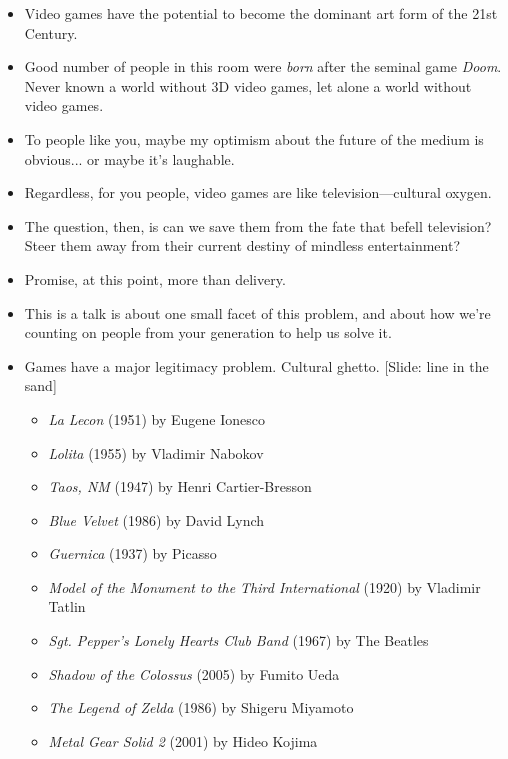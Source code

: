 \documentclass[12pt]{article}
\begin{document}
{\Huge

\begin{itemize}


\item Video games have the potential to become the dominant art form of the 21st Century.

\item Good number of people in this room were {\it born} after the seminal game {\it Doom}.  Never known a world without 3D video games, let alone a world without video games.

\item To people like you, maybe my optimism about the future of the medium is obvious... or maybe it's laughable.

\item Regardless, for you people, video games are like television---cultural oxygen.

\item The question, then, is can we save them from the fate that befell television?  Steer them away from their current destiny of mindless entertainment?

\item Promise, at this point, more than delivery.

\item This is a talk is about one small facet of this problem, and about how we're counting on people from your generation to help us solve it.


\item Games have a major legitimacy problem.  Cultural ghetto.  [Slide:  line in the sand] {\large \begin{itemize}
\item {\it La Lecon} (1951) by Eugene Ionesco
\item {\it Lolita} (1955) by Vladimir Nabokov
\item {\it Taos, NM} (1947) by Henri Cartier-Bresson
\item {\it Blue Velvet} (1986) by David Lynch
\item {\it Guernica} (1937) by Picasso
\item {\it Model of the Monument to the Third International} (1920) by Vladimir Tatlin
\item {\it Sgt. Pepper's Lonely Hearts Club Band} (1967) by The Beatles
\item {\it Shadow of the Colossus} (2005) by Fumito Ueda
\item {\it The Legend of Zelda} (1986) by Shigeru Miyamoto
\item {\it Metal Gear Solid 2} (2001) by Hideo Kojima 
\end{itemize} }


\end{itemize}}
\end{document}

